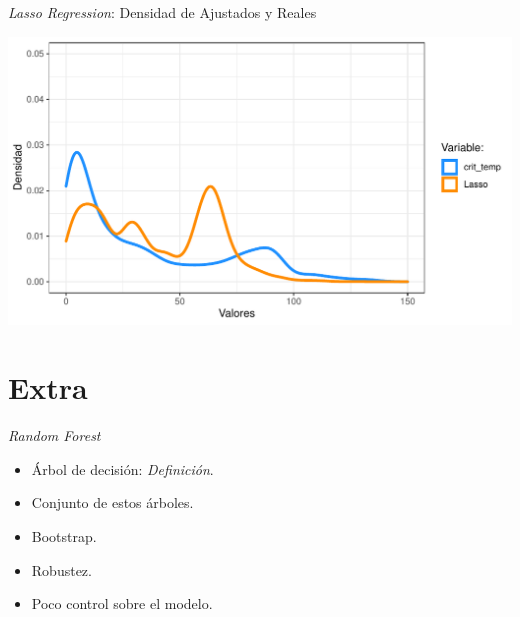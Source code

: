 \documentclass[11pt]{beamer}\usepackage{knitr}
\begin{document}
\begin{frame}[fragile]{\textit{Lasso Regression}: Densidad de Ajustados y Reales}

\begin{knitrout}\footnotesize
{}\color{fgcolor}

{\centering \includegraphics[width=\maxwidth]{figure/unnamed-chunk-10-1} 

}



\end{knitrout}


	\end{frame}



\section{Extra}

\begin{frame}{\textit{Random Forest}}
	\begin{itemize}
		\item Árbol de decisión: \textit{Definición}.
		\pause
		\item Conjunto de estos árboles.
		\pause
		\item Bootstrap.
		\pause
		\item Robustez.
		\pause
		\item Poco control sobre el modelo.
	\end{itemize}
\end{frame}
\end{document}
